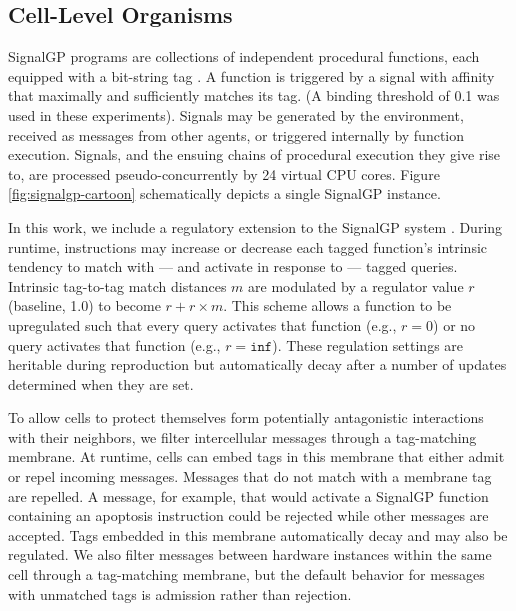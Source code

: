 \subsection{Cell-Level Organisms} \label{sup:cell_level_organisms}

SignalGP programs are collections of independent procedural functions, each equipped with a bit-string tag \cite{lalejini2018evolving}.
A function is triggered by a signal with affinity that maximally and sufficiently matches its tag.
(A binding threshold of 0.1 was used in these experiments).
Signals may be generated by the environment, received as messages from other agents, or triggered internally by function execution.
Signals, and the ensuing chains of procedural execution they give rise to, are processed pseudo-concurrently by 24 virtual CPU cores.
Figure \ref{fig:signalgp-cartoon} schematically depicts a single SignalGP instance.

In this work, we include a regulatory extension to the SignalGP system \cite{lalejini2021tag}.
During runtime, instructions may increase or decrease each tagged function's intrinsic tendency to match with --- and activate in response to --- tagged queries.
Intrinsic tag-to-tag match distances $m$ are modulated by a regulator value $r$ (baseline, 1.0) to become $r + r \times m$.
This scheme allows a function to be upregulated such that every query activates that function (e.g., $r = 0$) or no query activates that function (e.g., $r = \texttt{inf}$).
These regulation settings are heritable during reproduction but automatically decay after a number of updates determined when they are set.

To allow cells to protect themselves form potentially antagonistic interactions with their neighbors, we filter intercellular messages through a tag-matching membrane.
At runtime, cells can embed tags in this membrane that either admit or repel incoming messages.
Messages that do not match with a membrane tag are repelled.
A message, for example, that would activate a SignalGP function containing an apoptosis instruction could be rejected while other messages are accepted.
Tags embedded in this membrane automatically decay and may also be regulated.
We also filter messages between hardware instances within the same cell through a tag-matching membrane, but the default behavior for messages with unmatched tags is admission rather than rejection.

